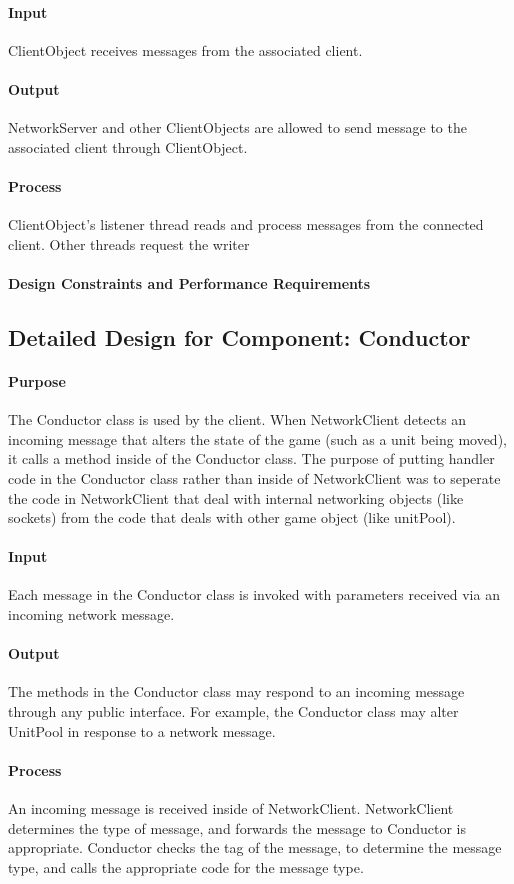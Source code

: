 \documentclass[12pt,a4paper,titlepage]{article}
\begin{document}
\paragraph{Input} ClientObject receives messages from the associated client. 
\paragraph{Output} NetworkServer and other ClientObjects are allowed
to send message to the associated client through ClientObject.
\paragraph{Process} ClientObject's listener thread reads and process messages from the connected client. Other threads request the writer
\paragraph{Design Constraints and Performance Requirements}

\subsection{Detailed Design for Component: Conductor}
\paragraph{Purpose} The Conductor class is used by the client. When NetworkClient detects an incoming message that alters the state of the game (such as a unit being moved), it calls a method inside of the Conductor class. The purpose of putting handler code in the Conductor class rather than inside of NetworkClient was to seperate the code in NetworkClient that deal with internal networking objects (like sockets) from the code that deals with other game object (like unitPool).
\paragraph{Input} Each message in the Conductor class is invoked with parameters received via an incoming network message.
\paragraph{Output} The methods in the Conductor class may respond to an incoming message through any public interface. For example, the Conductor class may alter UnitPool in response to a network message.
\paragraph{Process} An incoming message is received inside of NetworkClient. NetworkClient determines the type of message, and forwards the message to Conductor is appropriate. Conductor checks the tag of the message, to determine the message type, and calls the appropriate code for the message type.
\end{document}
